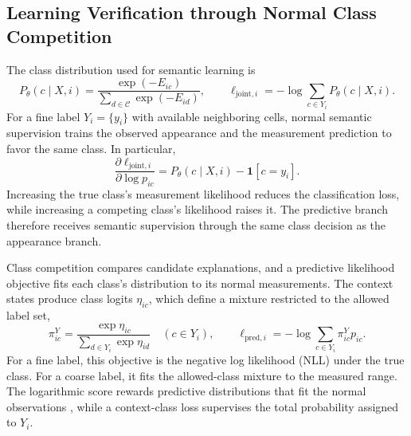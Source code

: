 \documentclass{article}
\begin{document}
\subsection{Learning Verification through Normal Class Competition}
\label{sec:learning}
The class distribution used for semantic learning is
\begin{equation}
 P_\theta(c\mid X,i)=\frac{\exp(-E_{ic})}{\sum_{d\in\mathcal C}\exp(-E_{id})},\qquad
 \ell_{\mathrm{joint},i}=-\log\sum_{c\in Y_i}P_\theta(c\mid X,i).
 \label{eq:jointloss}
\end{equation}
For a fine label $Y_i=\{y_i\}$ with available neighboring cells, normal semantic supervision trains the observed appearance and the measurement prediction to favor the same class. In particular,
\begin{equation}
 \frac{\partial\ell_{\mathrm{joint},i}}{\partial\log p_{ic}}
 =P_\theta(c\mid X,i)-\mathbf1[c=y_i].
 \label{eq:gradient}
\end{equation}
Increasing the true class's measurement likelihood reduces the classification loss, while increasing a competing class's likelihood raises it. The predictive branch therefore receives semantic supervision through the same class decision as the appearance branch.

Class competition compares candidate explanations, and a predictive likelihood objective fits each class's distribution to its normal measurements. The context states produce class logits $\eta_{ic}$, which define a mixture restricted to the allowed label set,
\begin{equation}
 \pi_{ic}^{Y}=\frac{\exp\eta_{ic}}{\sum_{d\in Y_i}\exp\eta_{id}}\quad(c\in Y_i),\qquad
 \ell_{\mathrm{pred},i}=-\log\sum_{c\in Y_i}\pi_{ic}^{Y}p_{ic}.
 \label{eq:predloss}
\end{equation}
For a fine label, this objective is the negative log likelihood (NLL) under the true class. For a coarse label, it fits the allowed-class mixture to the measured range. The logarithmic score rewards predictive distributions that fit the normal observations \citep{proper}, while a context-class loss supervises the total probability assigned to $Y_i$.
\end{document}
